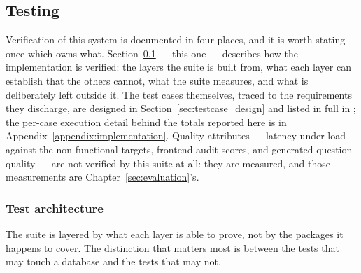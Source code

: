 \subsection{Testing}
\label{sec:impl_testing}

Verification of this system is documented in four places, and it is worth
stating once which owns what. Section~\ref{sec:impl_testing} --- this one ---
describes how the implementation is verified: the layers the suite is built
from, what each layer can establish that the others cannot, what the suite
measures, and what is deliberately left outside it. The test cases themselves,
traced to the requirements they discharge, are designed in
Section~\ref{sec:testcase_design} and listed in full in
; the per-case execution detail behind the
totals reported here is in Appendix~\ref{appendix:implementation}. Quality
attributes --- latency under load against the non-functional targets, frontend
audit scores, and generated-question quality --- are not verified by this suite
at all: they are measured, and those measurements are Chapter~\ref{sec:evaluation}'s.

\subsubsection{Test architecture}

The suite is layered by what each layer is able to prove, not by the packages
it happens to cover. The distinction that matters most is between the tests
that may touch a database and the tests that may not.

